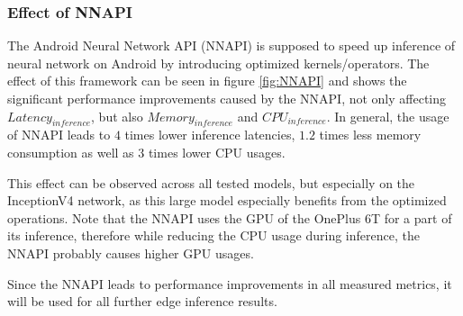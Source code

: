 \subsubsection{Effect of NNAPI}
The Android Neural Network API (NNAPI) is supposed to speed up inference of neural network on Android by introducing optimized kernels/operators. 
The effect of this framework can be seen in figure \ref{fig:NNAPI} and shows the significant performance improvements caused by the NNAPI, not only affecting $Latency_{inference}$, but also $Memory_{inference}$ and $CPU_{inference}$.
In general, the usage of NNAPI leads to $4$ times lower inference latencies, $1.2$ times less memory consumption as well as $3$ times lower CPU usages.

This effect can be observed across all tested models, but especially on the InceptionV4 network, as this large model especially benefits from the optimized operations.
Note that the NNAPI uses the GPU of the OnePlus 6T for a part of its inference, therefore while reducing the CPU usage during inference, the NNAPI probably causes higher GPU usages.

Since the NNAPI leads to performance improvements in all measured metrics, it will be used for all further edge inference results.

